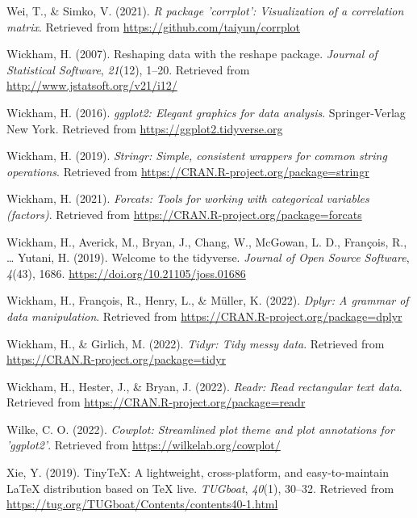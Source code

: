 \documentclass[
  english,
  man]{apa6}
\newlength{\cslhangindent}
\newlength{\cslentryspacingunit} %
\newenvironment{CSLReferences}[2] %
 {%
  \setlength{\parindent}{0pt}
  \ifodd #1
  \let\oldpar\par
  \def\par{\hangindent=\cslhangindent\oldpar}
  \fi
  \setlength{\parskip}{#2\cslentryspacingunit}
 }%
 {}
\begin{document}
\begin{CSLReferences}{1}{0}
\leavevmode{}%
Wei, T., \& Simko, V. (2021). \emph{R package 'corrplot': Visualization of a correlation matrix}. Retrieved from \url{https://github.com/taiyun/corrplot}

\leavevmode{}%
Wickham, H. (2007). Reshaping data with the {reshape} package. \emph{Journal of Statistical Software}, \emph{21}(12), 1--20. Retrieved from \url{http://www.jstatsoft.org/v21/i12/}

\leavevmode{}%
Wickham, H. (2016). \emph{ggplot2: Elegant graphics for data analysis}. Springer-Verlag New York. Retrieved from \url{https://ggplot2.tidyverse.org}

\leavevmode{}%
Wickham, H. (2019). \emph{Stringr: Simple, consistent wrappers for common string operations}. Retrieved from \url{https://CRAN.R-project.org/package=stringr}

\leavevmode{}%
Wickham, H. (2021). \emph{Forcats: Tools for working with categorical variables (factors)}. Retrieved from \url{https://CRAN.R-project.org/package=forcats}

\leavevmode{}%
Wickham, H., Averick, M., Bryan, J., Chang, W., McGowan, L. D., François, R., \ldots{} Yutani, H. (2019). Welcome to the {tidyverse}. \emph{Journal of Open Source Software}, \emph{4}(43), 1686. \url{https://doi.org/10.21105/joss.01686}

\leavevmode{}%
Wickham, H., François, R., Henry, L., \& Müller, K. (2022). \emph{Dplyr: A grammar of data manipulation}. Retrieved from \url{https://CRAN.R-project.org/package=dplyr}

\leavevmode{}%
Wickham, H., \& Girlich, M. (2022). \emph{Tidyr: Tidy messy data}. Retrieved from \url{https://CRAN.R-project.org/package=tidyr}

\leavevmode{}%
Wickham, H., Hester, J., \& Bryan, J. (2022). \emph{Readr: Read rectangular text data}. Retrieved from \url{https://CRAN.R-project.org/package=readr}

\leavevmode{}%
Wilke, C. O. (2022). \emph{Cowplot: Streamlined plot theme and plot annotations for 'ggplot2'}. Retrieved from \url{https://wilkelab.org/cowplot/}

\leavevmode{}%
Xie, Y. (2019). TinyTeX: A lightweight, cross-platform, and easy-to-maintain LaTeX distribution based on TeX live. \emph{TUGboat}, \emph{40}(1), 30--32. Retrieved from \url{https://tug.org/TUGboat/Contents/contents40-1.html}


\end{CSLReferences}
\end{document}
